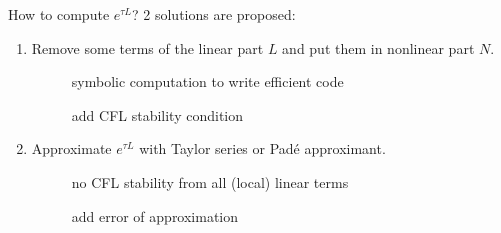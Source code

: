 \documentclass{beamer}
\newcommand{\cmark}{{\color{dgreen}\ding{52}}}
\newcommand{\xmark}{{\color{mred}\ding{55}}}
\begin{document}
\begin{frame}{How to compute $e^{\tau L}$?}
  2 solutions are proposed:
  \begin{enumerate}
    \item Remove some terms of the linear part $L$ and put them in nonlinear part $N$.
      \begin{description}
        \item[\cmark] symbolic computation to write efficient code
        \item[\xmark] add CFL stability condition
      \end{description}
    \item Approximate $e^{\tau L}$ with Taylor series or Padé approximant.
      \begin{description}
        \item[\cmark] no CFL stability from all (local) linear terms
        \item[\xmark] add error of approximation
      \end{description}
  \end{enumerate}
\end{frame}
\end{document}
